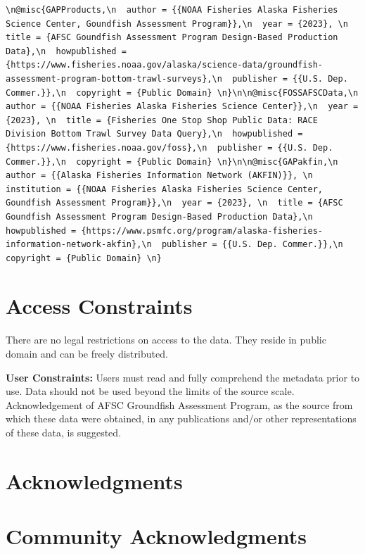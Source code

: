 \documentclass[
  letterpaper,
  oneside,
  open=any]{scrbook}
\begin{document}
\begin{verbatim}
\n@misc{GAPProducts,\n  author = {{NOAA Fisheries Alaska Fisheries Science Center, Goundfish Assessment Program}},\n  year = {2023}, \n  title = {AFSC Goundfish Assessment Program Design-Based Production Data},\n  howpublished = {https://www.fisheries.noaa.gov/alaska/science-data/groundfish-assessment-program-bottom-trawl-surveys},\n  publisher = {{U.S. Dep. Commer.}},\n  copyright = {Public Domain} \n}\n\n@misc{FOSSAFSCData,\n  author = {{NOAA Fisheries Alaska Fisheries Science Center}},\n  year = {2023}, \n  title = {Fisheries One Stop Shop Public Data: RACE Division Bottom Trawl Survey Data Query},\n  howpublished = {https://www.fisheries.noaa.gov/foss},\n  publisher = {{U.S. Dep. Commer.}},\n  copyright = {Public Domain} \n}\n\n@misc{GAPakfin,\n  author = {{Alaska Fisheries Information Network (AKFIN)}}, \n  institution = {{NOAA Fisheries Alaska Fisheries Science Center, Goundfish Assessment Program}},\n  year = {2023}, \n  title = {AFSC Goundfish Assessment Program Design-Based Production Data},\n  howpublished = {https://www.psmfc.org/program/alaska-fisheries-information-network-akfin},\n  publisher = {{U.S. Dep. Commer.}},\n  copyright = {Public Domain} \n}
\end{verbatim}

\hypertarget{access-constraints}{%
\chapter{Access Constraints}\label{access-constraints}}

There are no legal restrictions on access to the data. They reside in
public domain and can be freely distributed.

\textbf{User Constraints:} Users must read and fully comprehend the
metadata prior to use. Data should not be used beyond the limits of the
source scale. Acknowledgement of AFSC Groundfish Assessment Program, as
the source from which these data were obtained, in any publications
and/or other representations of these data, is suggested.

\hypertarget{acknowledgments}{%
\chapter{Acknowledgments}\label{acknowledgments}}

\hypertarget{community-acknowledgments}{%
\chapter{Community Acknowledgments}\label{community-acknowledgments}}
\end{document}
